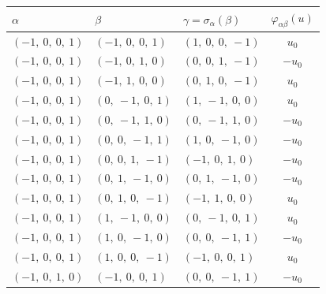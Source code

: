 \documentclass[11pt]{article}
\newcommand{\noi}{\noindent}
\theoremstyle{definition}
\begin{document}
\noi \noindent \begin{longtable}{|l|l|l|c|}
    \hline
    \textbf{$\alpha$} & \textbf{$\beta$} & \textbf{$\gamma = \sigma_{\alpha}(\beta)$} & $\varphi_{\alpha\beta}(u)$ \\
    \hline
    \endhead
    $\left( -1, \  0, \  0, \  1\right)$ & $\left( -1, \  0, \  0, \  1\right)$ & $\left( 1, \  0, \  0, \  -1\right)$ & $u_{0}$ \\
    \hline
    $\left( -1, \  0, \  0, \  1\right)$ & $\left( -1, \  0, \  1, \  0\right)$ & $\left( 0, \  0, \  1, \  -1\right)$ & $- u_{0}$ \\
    \hline
    $\left( -1, \  0, \  0, \  1\right)$ & $\left( -1, \  1, \  0, \  0\right)$ & $\left( 0, \  1, \  0, \  -1\right)$ & $u_{0}$ \\
    \hline
    $\left( -1, \  0, \  0, \  1\right)$ & $\left( 0, \  -1, \  0, \  1\right)$ & $\left( 1, \  -1, \  0, \  0\right)$ & $u_{0}$ \\
    \hline
    $\left( -1, \  0, \  0, \  1\right)$ & $\left( 0, \  -1, \  1, \  0\right)$ & $\left( 0, \  -1, \  1, \  0\right)$ & $- u_{0}$ \\
    \hline
    $\left( -1, \  0, \  0, \  1\right)$ & $\left( 0, \  0, \  -1, \  1\right)$ & $\left( 1, \  0, \  -1, \  0\right)$ & $- u_{0}$ \\
    \hline
    $\left( -1, \  0, \  0, \  1\right)$ & $\left( 0, \  0, \  1, \  -1\right)$ & $\left( -1, \  0, \  1, \  0\right)$ & $- u_{0}$ \\
    \hline
    $\left( -1, \  0, \  0, \  1\right)$ & $\left( 0, \  1, \  -1, \  0\right)$ & $\left( 0, \  1, \  -1, \  0\right)$ & $- u_{0}$ \\
    \hline
    $\left( -1, \  0, \  0, \  1\right)$ & $\left( 0, \  1, \  0, \  -1\right)$ & $\left( -1, \  1, \  0, \  0\right)$ & $u_{0}$ \\
    \hline
    $\left( -1, \  0, \  0, \  1\right)$ & $\left( 1, \  -1, \  0, \  0\right)$ & $\left( 0, \  -1, \  0, \  1\right)$ & $u_{0}$ \\
    \hline
    $\left( -1, \  0, \  0, \  1\right)$ & $\left( 1, \  0, \  -1, \  0\right)$ & $\left( 0, \  0, \  -1, \  1\right)$ & $- u_{0}$ \\
    \hline
    $\left( -1, \  0, \  0, \  1\right)$ & $\left( 1, \  0, \  0, \  -1\right)$ & $\left( -1, \  0, \  0, \  1\right)$ & $u_{0}$ \\
    \hline
    $\left( -1, \  0, \  1, \  0\right)$ & $\left( -1, \  0, \  0, \  1\right)$ & $\left( 0, \  0, \  -1, \  1\right)$ & $- u_{0}$ \\

\end{longtable}
\end{document}
